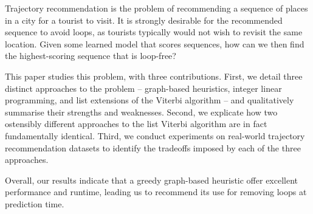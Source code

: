 
Trajectory recommendation is the problem of recommending a sequence of places in a city for a tourist to visit.
It is strongly desirable for the recommended sequence to avoid loops, as tourists typically would not wish to revisit the same location.
Given some learned model that scores sequences, how can we then find the highest-scoring sequence that is loop-free?

This paper studies this problem, with three contributions.
First, we detail three distinct approaches to the problem -- 
graph-based heuristics,
integer linear programming, and
list extensions of the Viterbi algorithm
-- and qualitatively summarise their strengths and weaknesses.
Second, we explicate how two ostensibly different approaches to the list Viterbi algorithm are in fact fundamentally identical.
Third, we conduct experiments on real-world trajectory recommendation datasets to identify the tradeoffs imposed by each of the three approaches.

Overall, our results indicate that a greedy graph-based heuristic offer excellent performance and runtime, leading us to recommend its use for removing loops at prediction time.

